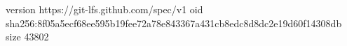 version https://git-lfs.github.com/spec/v1
oid sha256:8f05a5ecf68ee595b19fee72a78e843367a431cb8edc8d8dc2e19d60f14308db
size 43802
